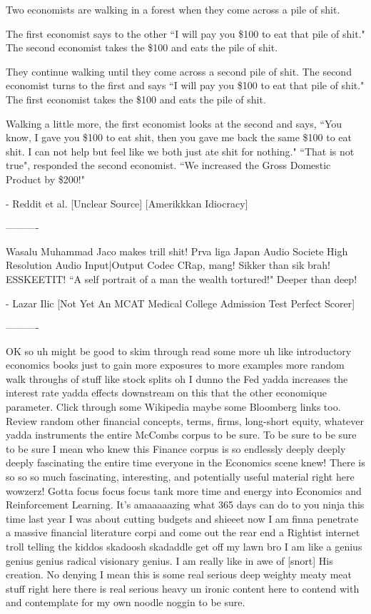 Two economists are walking in a forest when they come across a pile of shit.

The first economist says to the other ``I will pay you \$100 to eat that pile of shit." The second economist takes the \$100 and eats the pile of shit.

They continue walking until they come across a second pile of shit. The second economist turns to the first and says ``I will pay you \$100 to eat that pile of shit." The first economist takes the \$100 and eats the pile of shit.

Walking a little more, the first economist looks at the second and says, ``You know, I gave you \$100 to eat shit, then you gave me back the same \$100 to eat shit. I can not help but feel like we both just ate shit for nothing." ``That is not true", responded the second economist. ``We increased the Gross Domestic Product by \$200!"

- Reddit et al. [Unclear Source] [Amerikkkan Idiocracy]

----------

Wasalu Muhammad Jaco makes trill shit! Prva liga Japan Audio Societe High Resolution Audio Input|Output Codec CRap, mang! Sikker than sik brah! ESSKEETIT! ``A self portrait of a man the wealth tortured!" Deeper than deep!

- Lazar Ilic [Not Yet An MCAT Medical College Admission Test Perfect Scorer]

----------

OK so uh might be good to skim through read some more uh like introductory economics books just to gain more exposures to more examples more random walk throughs of stuff like stock splits oh I dunno the Fed yadda increases the interest rate yadda effects downstream on this that the other economique parameter. Click through some Wikipedia maybe some Bloomberg links too. Review random other financial concepts, terms, firms, long-short equity, whatever yadda instruments the entire McCombs corpus to be sure. To be sure to be sure to be sure I mean who knew this Finance corpus is so endlessly deeply deeply deeply fascinating the entire time everyone in the Economics scene knew! There is so so so much fascinating, interesting, and potentially useful material right here wowzerz! Gotta focus focus focus tank more time and energy into Economics and Reinforcement Learning. It's amaaaaazing what 365 days can do to you ninja this time last year I was about cutting budgets and shieeet now I am finna penetrate a massive financial literature corpi and come out the rear end a Rightist internet troll telling the kiddos skadoosh skadaddle get off my lawn bro I am like a genius genius genius radical visionary genius. I am really like in awe of [snort] His creation. No denying I mean this is some real serious deep weighty meaty meat stuff right here there is real serious heavy un ironic content here to contend with and contemplate for my own noodle noggin to be sure.

